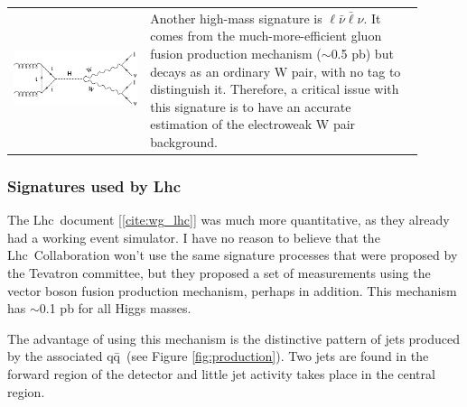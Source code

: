 \documentclass[12pt]{article}
\def\lhc{{\sc Lhc}}
\def\qqbar{q\={q}}
\begin{document}
\vspace{\parskip}

\begin{tabular}{p{0.3\linewidth} p{0.6\linewidth}}
  \begin{minipage}{\linewidth} \centering \includegraphics[scale=0.4]{signature_HC.eps} \end{minipage} &

  \begin{minipage}{\linewidth}

    Another high-mass signature is $\ell \bar{\nu} \bar{\ell} \nu$. It
    comes from the much-more-efficient gluon fusion production
    mechanism ($\sim$0.5 pb) but decays as an ordinary W pair, with no
    tag to distinguish it. Therefore, a critical issue with this
    signature is to have an accurate estimation of the electroweak W
    pair background.

  \end{minipage}
\end{tabular}

\vspace{\parskip}

\subsubsection{Signatures used by \lhc}

The \lhc\ document [\ref{cite:wg_lhc}] was much more quantitative, as
they already had a working event simulator. I have no reason to
believe that the \lhc\ Collaboration won't use the same signature
processes that were proposed by the Tevatron committee, but they
proposed a set of measurements using the vector boson fusion
production mechanism, perhaps in addition. This mechanism has
$\sim$0.1 pb for all Higgs masses.

The advantage of using this mechanism is the distinctive pattern of
jets produced by the associated \qqbar\ (see Figure
\ref{fig:production}). Two jets are found in the forward region of the
detector and little jet activity takes place in the central region.
\end{document}
